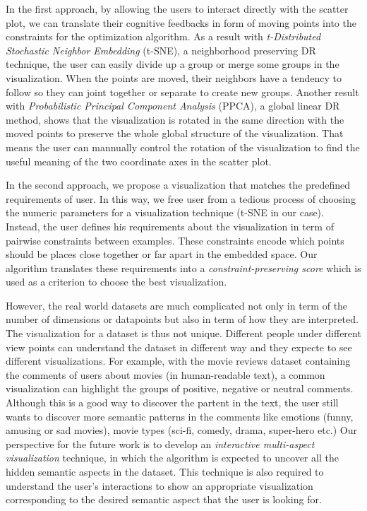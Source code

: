 In the first approach, by allowing the users to interact directly with the scatter plot, we can translate their cognitive feedbacks in form of moving points into the constraints for the optimization algorithm.
As a result with \emph{t-Distributed Stochastic Neighbor Embedding} (t-SNE), a neighborhood preserving DR technique, the user can easily divide up a group or merge some groups in the visualization.
When the points are moved, their neighbors have a tendency to follow so they can joint together or separate to create new groups.
Another result with \emph{Probabilistic Principal Component Analysis} (PPCA), a global linear DR method, shows that the visualization is rotated in the same direction with the moved points to preserve the whole global structure of the visualization. That means the user can mannually control the rotation of the visualization to find the useful meaning of the two coordinate axes in the scatter plot.

In the second approach, we propose a visualization that matches the predefined requirements of user.
In this way, we free user from a tedious process of choosing the numeric parameters for a visualization technique (t-SNE in our case).
Instead, the user defines his requirements about the visualization in term of pairwise constraints between examples.
These constraints encode which points should be places close together or far apart in the embedded space.
Our algorithm translates these requirements into a \emph{constraint-preserving score} which is used as a criterion to choose the best visualization.

However, the real world datasets are much complicated not only in term of the number of dimensions or datapoints but also in term of how they are interpreted.
The visualization for a dataset is thus not unique. Different people under different view points can understand the dataset in different way and they expecte to see different visualizations.
For example, with the movie reviews dataset containing the comments of users about movies (in human-readable text), a common visualization can highlight the groups of positive, negative or neutral comments.
Although this is a good way to discover the partent in the text, the user still wants to discover more semantic patterns in the comments like emotions (funny, amusing or sad movies), movie types (sci-fi, comedy, drama, super-hero etc.)
Our perspective for the future work is to develop an \emph{interactive multi-aspect visualization} technique, in which the algorithm is expected to uncover all the hidden semantic aspects in the dataset.
This technique is also required to understand the user's interactions to show an appropriate visualization corresponding to the desired semantic aspect that the user is looking for.